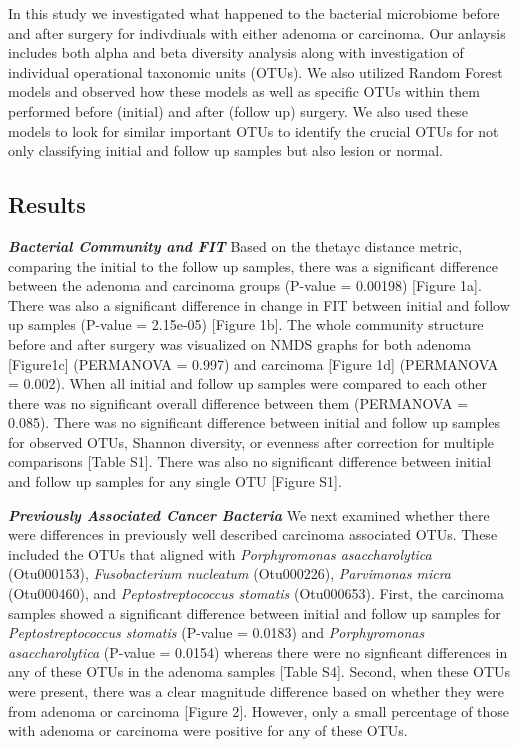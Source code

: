 \documentclass[12pt,]{article}
\begin{document}
In this study we investigated what happened to the bacterial microbiome
before and after surgery for indivdiuals with either adenoma or
carcinoma. Our anlaysis includes both alpha and beta diversity analysis
along with investigation of individual operational taxonomic units
(OTUs). We also utilized Random Forest models and observed how these
models as well as specific OTUs within them performed before (initial)
and after (follow up) surgery. We also used these models to look for
similar important OTUs to identify the crucial OTUs for not only
classifying initial and follow up samples but also lesion or normal.

\newpage

\subsection{Results}\label{results}

\textbf{\emph{Bacterial Community and FIT}} Based on the thetayc
distance metric, comparing the initial to the follow up samples, there
was a significant difference between the adenoma and carcinoma groups
(P-value = 0.00198) {[}Figure 1a{]}. There was also a significant
difference in change in FIT between initial and follow up samples
(P-value = 2.15e-05) {[}Figure 1b{]}. The whole community structure
before and after surgery was visualized on NMDS graphs for both adenoma
{[}Figure1c{]} (PERMANOVA = 0.997) and carcinoma {[}Figure 1d{]}
(PERMANOVA = 0.002). When all initial and follow up samples were
compared to each other there was no significant overall difference
between them (PERMANOVA = 0.085). There was no significant difference
between initial and follow up samples for observed OTUs, Shannon
diversity, or evenness after correction for multiple comparisons
{[}Table S1{]}. There was also no significant difference between initial
and follow up samples for any single OTU {[}Figure S1{]}.

\textbf{\emph{Previously Associated Cancer Bacteria}} We next examined
whether there were differences in previously well described carcinoma
associated OTUs. These included the OTUs that aligned with
\emph{Porphyromonas asaccharolytica} (Otu000153), \emph{Fusobacterium
nucleatum} (Otu000226), \emph{Parvimonas micra} (Otu000460), and
\emph{Peptostreptococcus stomatis} (Otu000653). First, the carcinoma
samples showed a significant difference between initial and follow up
samples for \emph{Peptostreptococcus stomatis} (P-value = 0.0183) and
\emph{Porphyromonas asaccharolytica} (P-value = 0.0154) whereas there
were no signficant differences in any of these OTUs in the adenoma
samples {[}Table S4{]}. Second, when these OTUs were present, there was
a clear magnitude difference based on whether they were from adenoma or
carcinoma {[}Figure 2{]}. However, only a small percentage of those with
adenoma or carcinoma were positive for any of these OTUs.
\end{document}
